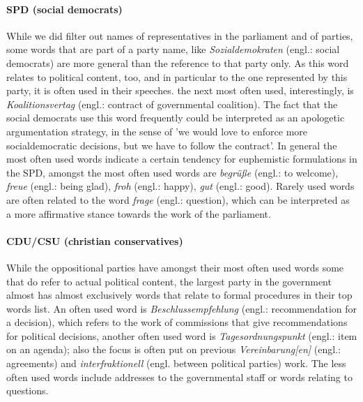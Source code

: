 \documentclass{article} %
\begin{document}
\paragraph{SPD (social democrats)}
While we did filter out names of representatives in the parliament and of parties, some words that are part of a party name, like {\em Sozialdemokraten} (engl.: social democrats) are more general than the reference to that party only. As this word relates to political content, too, and in particular to the one represented by this party, it is often used in their speeches. the next most often used, interestingly, is {\em Koalitionsvertag} (engl.: contract of governmental coalition). The fact that the social democrats use this word frequently could be interpreted as an apologetic argumentation strategy, in the sense of 'we would love to enforce more socialdemocratic decisions, but we have to follow the contract'. In general the most often used words indicate a certain tendency for euphemistic formulations in the SPD, amongst the most often used words are {\em begr\"u\ss{}e} (engl.: to welcome), {\em freue} (engl.: being glad), {\em froh} (engl.: happy), {\em gut} (engl.: good). Rarely used words are often related to the word {\em frage} (engl.: question), which can be interpreted as a more affirmative stance towards the work of the parliament. 

\paragraph{CDU/CSU (christian conservatives)}
While the oppositional parties have amongst their most often used words some that do refer to actual political content, the largest party in the government almost has almost exclusively words that relate to formal procedures in their top words list. An often used word is {\em Beschlussempfehlung} (engl.: recommendation for a decision), which refers to the work of commissions that give recommendations for political decisions, another often used word is {\em Tagesordnungspunkt} (engl.: item on an agenda); also the focus is often put on previous {\em Vereinbarung[en]} (engl.: agreements) and {\em interfraktionell} (engl. between political parties) work. The less often used words include addresses to the governmental staff or words relating to questions. 
\end{document}
